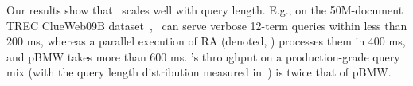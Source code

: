 Our results show that \alg\ scales well with query length.
E.g., on the 50M-document TREC ClueWeb09B dataset~\cite{ClueWeb09}, %
\alg\ can serve verbose 12-term queries within less than 200 ms, 
whereas a parallel execution of RA (denoted, \pRA) processes them in 400 ms, and pBMW takes more than 600 ms. 
\alg's throughput on a production-grade query mix (with the query length distribution measured in~\cite{sigir/Guy16}) is twice that of pBMW.


